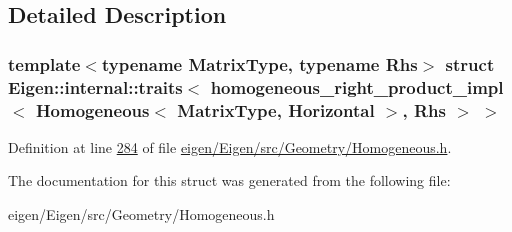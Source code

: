 \subsection{Detailed Description}
\subsubsection*{template$<$typename Matrix\+Type, typename Rhs$>$\newline
struct Eigen\+::internal\+::traits$<$ homogeneous\+\_\+right\+\_\+product\+\_\+impl$<$ Homogeneous$<$ Matrix\+Type, Horizontal $>$, Rhs $>$ $>$}



Definition at line \hyperlink{eigen_2_eigen_2src_2_geometry_2_homogeneous_8h_source_l00284}{284} of file \hyperlink{eigen_2_eigen_2src_2_geometry_2_homogeneous_8h_source}{eigen/\+Eigen/src/\+Geometry/\+Homogeneous.\+h}.



The documentation for this struct was generated from the following file\+:\begin{DoxyCompactItemize}
\item 
eigen/\+Eigen/src/\+Geometry/\+Homogeneous.\+h\end{DoxyCompactItemize}
